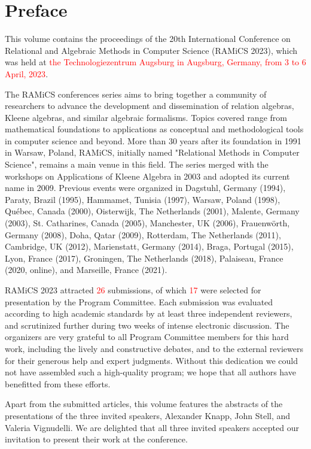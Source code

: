 \documentclass{llncs}
\newcommand{\red}[1]{\textcolor{red}{#1}}
\begin{document}
\section*{Preface}
This volume contains the proceedings of the 20th International
Conference on Relational and Algebraic Methods in Computer Science
(RAMiCS 2023), which was held at \red{the Technologiezentrum Augsburg in
Augsburg, Germany, from 3 to 6 April, 2023}.

The RAMiCS conferences series aims to bring together a community of
researchers to advance the development and dissemination of relation
algebras, Kleene algebras, and similar algebraic formalisms. Topics
covered range from mathematical foundations to applications as
conceptual and methodological tools in computer science and
beyond. More than 30 years after its foundation in 1991 in Warsaw,
Poland, RAMiCS, initially named "Relational Methods in Computer
Science", remains a main venue in this field. The series merged with
the workshops on Applications of Kleene Algebra in 2003 and adopted
its current name in 2009. Previous events were organized in Dagstuhl,
Germany (1994), Paraty, Brazil (1995), Hammamet, Tunisia (1997),
Warsaw, Poland (1998), Qu\'ebec, Canada (2000), Oisterwijk, The
Netherlands (2001), Malente, Germany (2003), St. Catharines, Canada
(2005), Manchester, UK (2006), Frauenw\"orth, Germany (2008), Doha,
Qatar (2009), Rotterdam, The Netherlands (2011), Cambridge, UK (2012),
Marienstatt, Germany (2014), Braga, Portugal (2015), Lyon, France
(2017), Groningen, The Netherlands (2018), Palaiseau, France (2020,
online), and Marseille, France (2021).

RAMiCS 2023 attracted \red{26} submissions, of which \red{17} were
selected for presentation by the Program Committee. Each submission
was evaluated according to high academic standards by at least three
independent reviewers, and scrutinized further during two weeks of
intense electronic discussion. The organizers are very grateful to all
Program Committee members for this hard work, including the lively and
constructive debates, and to the external reviewers for their generous
help and expert judgments. Without this dedication we could not have
assembled such a high-quality program; we hope that all authors have
benefitted from these efforts.

Apart from the submitted articles, this volume features the abstracts
of the presentations of the three invited speakers, Alexander Knapp,
John Stell, and Valeria Vignudelli. We are delighted that all three
invited speakers accepted our invitation to present their work at the
conference.
\end{document}
